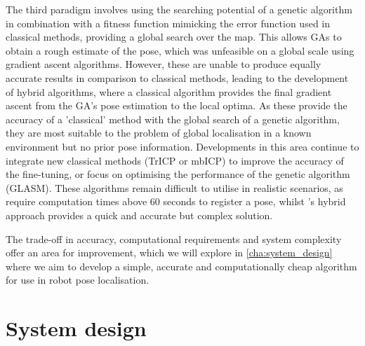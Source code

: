 \documentclass[authoryearcitations]{UoYCSproject}
\begin{document}
The third paradigm involves using the searching potential of a genetic algorithm in combination with a fitness function mimicking the error function used in classical methods, providing a global search over the map. This allows GAs to obtain a rough estimate of the pose, which was unfeasible on a global scale using gradient ascent algorithms. However, these are unable to produce equally accurate results in comparison to classical methods, leading to the development of hybrid algorithms, where a classical algorithm provides the final gradient ascent from the GA's pose estimation to the local optima. As these provide the accuracy of a 'classical' method with the global search of a genetic algorithm, they are most suitable to the problem of global localisation in a known environment but no prior pose information. Developments in this area continue to integrate new classical methods (TrICP or mbICP) to improve the accuracy of the fine-tuning, or focus on optimising the performance of the genetic algorithm (GLASM). These algorithms remain difficult to utilise in realistic scenarios, as \citet{Chow2004-xc} require computation times above 60 seconds to register a pose, whilst \citet{Lenac2011-co}'s hybrid approach provides a quick and accurate but complex solution. 

The trade-off in accuracy, computational requirements and system complexity offer an area for improvement, which we will explore in \autoref{cha:system_design} where we aim to develop a simple, accurate and computationally cheap algorithm for use in robot pose localisation.

\clearpage

\chapter{System design}
\label{cha:system_design}



\end{document}
